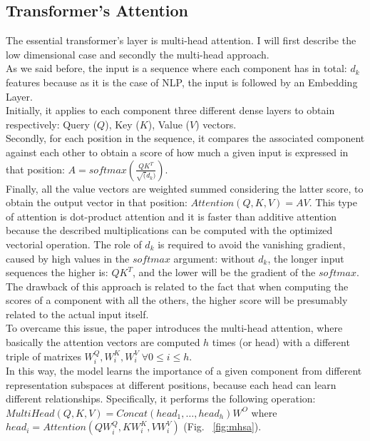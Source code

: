 \documentclass[LaM,binding=0.6cm]{sapthesis}
\begin{document}
\subsection{Transformer's Attention}
The essential transformer's layer is multi-head attention. I will first describe the low dimensional case and secondly the multi-head approach.\\As we said before, the input is a sequence where each component has in total: $d_k$ features because as it is the case of NLP, the input is followed by an Embedding Layer.\\Initially, it applies to each component three different dense layers to obtain respectively: Query ($Q$), Key ($K$), Value ($V$) vectors.\\Secondly, for each position in the sequence, it compares the associated component against each other to obtain a score of how much a given input is expressed in that position: $A = softmax\left(\frac{QK^T}{\sqrt(d_k)}\right)$.\\Finally, all the value vectors are weighted summed considering the latter score, to obtain the output vector in that position: $Attention(Q, K, V) = AV$. This type of attention is dot-product attention and it is faster than additive attention because the described multiplications can be computed with the optimized vectorial operation. The role of $d_k$ is required to avoid the vanishing gradient, caused by high values in the $softmax$ argument: without $d_k$, the longer input sequences the higher is: $QK^T$, and the lower will be the gradient of the $softmax$.\\The drawback of this approach is related to the fact that when computing the scores of a component with all the others, the higher score will be presumably related to the actual input itself.\\To overcame this issue, the paper introduces the multi-head attention, where basically the attention vectors are computed $h$ times (or head) with a different triple of matrixes $W^{Q}_{i}, W^{K}_{i}, W^{V}_{i} \; \forall 0\leq i\le h$.\\In this way, the model learns the importance of a given component from different representation subspaces at different positions, because each head can learn different relationships. Specifically, it performs the following operation: $MultiHead(Q,K,V)=Concat\left(head_1,\dots,head_h\right)W^O$ where $head_i= Attention\left(QW_{i}^{Q} , KW_{i}^{K} , VW_{i}^{V} \right)$ (Fig. ~\ref{fig:mhsa}).
\end{document}
